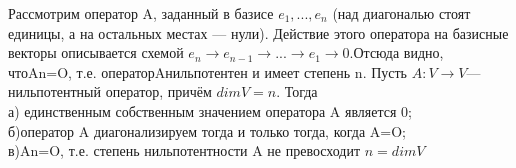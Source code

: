 \documentclass[12pt, oneside]{book}
\theoremstyle{definition}
\begin{document}
\begin{enumerate}
Рассмотрим оператор A, заданный в базисе $e_1,...,e_n$ (над диагональю стоят единицы, а на остальных местах — нули). Действие этого оператора на базисные векторы описывается схемой $e_n \rightarrow e_{n-1} \rightarrow ... \rightarrow e_1 \rightarrow 0$.Отсюда видно, чтоAn=O, т.е. операторAнильпотентен и имеет степень n.
Пусть $A:V→V$— нильпотентный оператор, причём $dimV=n$. Тогда \\
а) единственным собственным значением оператора A является 0;\\
б)оператор A диагонализируем тогда и только тогда, когда A=O;\\
в)An=O, т.е. степень нильпотентности A не превосходит $n= dimV$
\
\end{enumerate}
\end{document}
